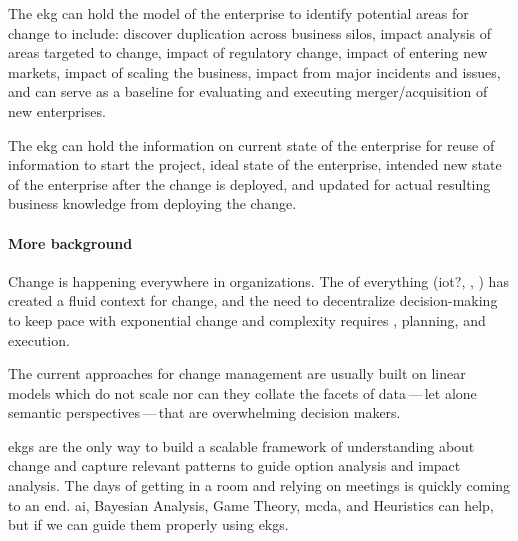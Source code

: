 The \gls{ekg} can hold the model of the enterprise to identify potential areas for change to include:
discover duplication across business silos, impact analysis of areas targeted to change,
impact of regulatory change, impact of entering new markets, impact of scaling the business,
impact from major incidents and issues, and can serve as a baseline for evaluating and executing
merger/acquisition of new enterprises.

The \gls{ekg} can hold the information on current state of the enterprise for reuse of information to start the
project, ideal state of the enterprise, intended new state of the enterprise after the change is deployed,
and updated for actual resulting business knowledge from deploying the change.

\paragraph*{More background}
Change is happening everywhere in organizations.
The  of everything (\gls{iot}?, , )
has created a fluid context for change, and the need to decentralize decision-making to keep pace with
exponential change and complexity requires , planning, and execution.

The current approaches for change management are usually built on linear models which do not scale nor can they collate
the facets of data\,---\,let alone semantic perspectives\,---\,that are overwhelming decision makers.

\Glspl{ekg} are the only way to build a scalable framework of understanding about change and capture relevant patterns
to guide option analysis and impact analysis.
The days of getting in a room and relying on meetings is quickly coming to an end.
\Gls{ai}, Bayesian Analysis, Game Theory, \gls{mcda},
and Heuristics can help, but  if we can guide them properly using \glspl{ekg}.

